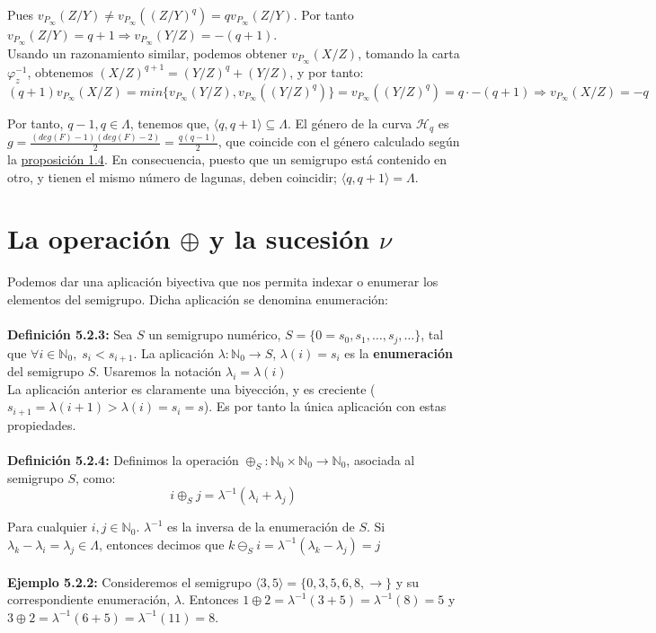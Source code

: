 \documentclass[11pt,spanish]{book}
\begin{document}
Pues $v_{P_\infty}(Z/Y)\neq v_{P_\infty}((Z/Y)^{q})=q v_{P_\infty}(Z/Y)$. Por tanto $v_{P_\infty}(Z/Y) = q+1\Rightarrow v_{P_\infty}(Y/Z)=-(q+1)$.\\

Usando un razonamiento similar, podemos obtener $v_{P_\infty}(X/Z)$, tomando la carta $\varphi_{z}^{-1}$, obtenemos $(X/Z)^{q+1}=(Y/Z)^{q}+(Y/Z)$, y por tanto: $$(q+1)v_{P_{\infty}}(X/Z)=min\{v_{P_\infty}(Y/Z),v_{P_\infty}((Y/Z)^{q})\}=v_{P_\infty}((Y/Z)^{q})=q\cdot -(q+1)\Rightarrow v_{P_\infty}(X/Z)=-q$$

Por tanto, $q-1,q\in\Lambda$, tenemos que, $\langle q,q+1\rangle \subseteq \Lambda$. El género de la curva $\mathcal{H}_q$ es $g=\frac{(deg(F)-1)(deg(F)-2)}{2}=\frac{q(q-1)}{2}$, que coincide con el género calculado según la \hyperlink{semigrupo2elemntos}{proposición 1.4}. En consecuencia, puesto que un semigrupo está contenido en otro, y tienen el mismo número de lagunas, deben coincidir; $\langle q,q+1\rangle = \Lambda$.
\\
\section{La operación $\oplus$ y la sucesión $\nu$}
Podemos dar una aplicación biyectiva que nos permita indexar o enumerar los elementos del semigrupo. Dicha aplicación se denomina enumeración:\\
\\\hypertarget{def5.2.3}{\textbf{Definición 5.2.3: }} Sea $S$ un semigrupo numérico, $S=\{0=s_0,s_1,\ldots,s_j,\ldots\}$, tal que $\forall i\in\mathbb{N}_0,\; s_i<s_{i+1}$. La aplicación $\lambda:\mathbb{N}_0\rightarrow S$, $\lambda (i)=s_i$ es la \textbf{enumeración} del semigrupo $S$. Usaremos la notación $\lambda_i = \lambda (i)$\\

La aplicación anterior es claramente una biyección, y es creciente ($s_{i+1}=\lambda(i+1)>\lambda (i)=s_{i}=s$). Es por tanto la única aplicación con estas propiedades. \\
\\\hypertarget{def5.2.4}{\textbf{Definición 5.2.4: }} Definimos la operación $\oplus_{S}:\mathbb{N}_0\times\mathbb{N}_0\rightarrow \mathbb{N}_0$, asociada al semigrupo $S$, como:
$$i\oplus_{S} j=\lambda^{-1}(\lambda_i + \lambda_j)$$

Para cualquier $i,j\in\mathbb{N}_0$. $\lambda^{-1}$ es la inversa de la enumeración de $S$. Si $\lambda_k - \lambda_i = \lambda_{j}\in \Lambda $, entonces decimos que $k\ominus_{S} i =\lambda^{-1}(\lambda_k-\lambda_j)=j$ \\
\\ \textbf{Ejemplo 5.2.2: } Consideremos el semigrupo $\langle 3,5\rangle =\{0,3,5,6,8,\rightarrow\}$ y su correspondiente enumeración, $\lambda$. Entonces $1\oplus2=\lambda^{-1}(3+5)=\lambda^{-1}(8)=5$ y $3\oplus2=\lambda^{-1}(6+5)=\lambda^{-1}(11)=8$.\\
\end{document}
